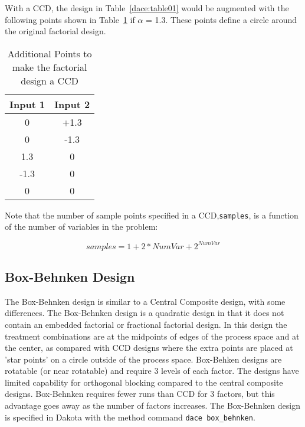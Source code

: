 With a CCD, the design in Table~\ref{dace:table01} would be augmented 
with the following points shown in Table~\ref{dace:table02} 
if $\alpha$ = 1.3. These points define a circle around the original  
factorial design.

\begin{table}[ht]
 \caption{Additional Points to make the factorial design a CCD}
 \label{dace:table02}
 \begin{center}
  \begin{tabular}{c|c}
  \hline
  Input 1            & Input 2         \\ \hline \hline 
  0                 & +1.3             \\ \hline 
  0                 & -1.3           \\ \hline
  1.3                 & 0     \\ \hline
  -1.3                 & 0       \\ \hline
  0                  & 0          \\ \hline
  \end{tabular}
\end{center}
\end{table}

Note that the number of sample points specified in a CCD,\texttt{samples},
is a function of the number of variables in the problem: 

\[
samples = 1 + 2*NumVar + 2^{NumVar}
\]

\subsection{Box-Behnken Design}\label{dace:bb}

The Box-Behnken design is similar to a Central Composite design, with
some differences.  The Box-Behnken design is a quadratic design in
that it does not contain an embedded factorial or fractional factorial
design. In this design the treatment combinations are at the midpoints
of edges of the process space and at the center, as compared with CCD
designs where the extra points are placed at 'star points' on a circle
outside of the process space. Box-Behken designs are rotatable (or
near rotatable) and require 3 levels of each factor. The designs have
limited capability for orthogonal blocking compared to the central
composite designs.  Box-Behnken requires fewer runs than CCD for 3
factors, but this advantage goes away as the number of factors
increases.  The Box-Behnken design is specified in Dakota with the
method command \texttt{dace box\_behnken}.

